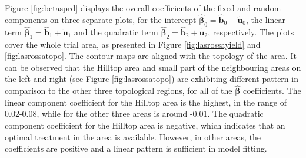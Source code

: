 \documentclass[a4paper]{article}   	%
\begin{document}
	Figure \ref{fig:betasprd} displays the overall coefficients of the fixed and random components on three separate plots, for the intercept $\hat{\bm{\beta}}_0 = \hat{\bm{b}}_0+\tilde{\bm{u}}_0$, the linear term $\hat{\bm{\beta}}_1 = \hat{\bm{b}}_1+\tilde{\bm{u}}_1$ and the quadratic term $\hat{\bm{\beta}}_2 = \hat{\bm{b}}_2+\tilde{\bm{u}}_2$, respectively. The plots cover the whole trial area, as presented in Figure \ref{fig:lasrossayield} and \ref{fig:lasrossatopo}. 
	The contour maps are aligned with the topology of the area. It can be observed that the Hilltop area and small part of the neighbouring areas on the left and right (see Figure \ref{fig:lasrossatopo}) are exhibiting different pattern in comparison to the other three topological regions, for all of the $\hat{\bm{\beta}}$ coefficients. The linear component coefficient for the Hilltop area is the highest, in the range of 0.02-0.08, while for the other three areas is around -0.01. %
	The quadratic component coefficient for the Hilltop area is negative, which indicates that an optimal treatment in the area is available. However, in other areas, the coefficients are positive and a linear pattern is sufficient in model fitting. 
	
	
\end{document}

